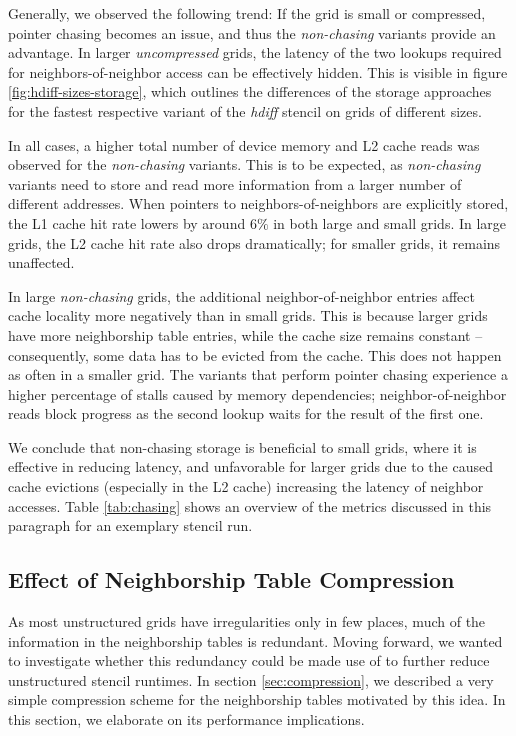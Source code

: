 Generally, we observed the following trend: If the grid is small or compressed, pointer chasing becomes an issue, and thus the \emph{non-chasing} variants provide an advantage. In larger \emph{uncompressed} grids, the latency of the two lookups required for neighbors-of-neighbor access can be effectively hidden. This is visible in figure \ref{fig:hdiff-sizes-storage}, which outlines the differences of the storage approaches for the fastest respective variant of the \emph{hdiff} stencil on grids of different sizes. 

In all cases, a higher total number of device memory and L2 cache reads was observed for the \emph{non-chasing} variants. This is to be expected, as \emph{non-chasing} variants need to store and read more information from a larger number of different addresses. When pointers to neighbors-of-neighbors are explicitly stored, the L1 cache hit rate lowers by around $6\%$ in both large and small grids. In large grids, the L2 cache hit rate also drops dramatically; for smaller grids, it remains unaffected.

In large \emph{non-chasing} grids, the additional neighbor-of-neighbor entries affect cache locality more negatively than in small grids. This is because larger grids have more neighborship table entries, while the cache size remains constant -- consequently, some data has to be evicted from the cache. This does not happen as often in a smaller grid. The variants that perform pointer chasing experience a higher percentage of stalls caused by memory dependencies; neighbor-of-neighbor reads block progress as the second lookup waits for the result of the first one. 

We conclude that non-chasing storage is beneficial to small grids, where it is effective in reducing latency, and unfavorable for larger grids due to the caused cache evictions (especially in the L2 cache) increasing the latency of neighbor accesses. Table \ref{tab:chasing} shows an overview of the metrics discussed in this paragraph for an exemplary stencil run.

\subsection{Effect of Neighborship Table Compression}

As most unstructured grids have irregularities only in few places, much of the information in the neighborship tables is redundant. Moving forward, we wanted to investigate whether this redundancy could be made use of to further reduce unstructured stencil runtimes. In section \ref{sec:compression}, we described a very simple compression scheme for the neighborship tables motivated by this idea. In this section, we elaborate on its performance implications.

